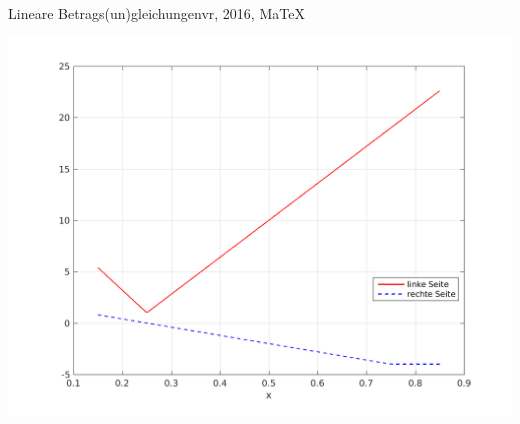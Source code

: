 \begin{MAufgabe}{Lineare Betrags(un)gleichungen}{vr, 2016, MaTeX}
 \begin{center}
 \includegraphics[width=0.8\linewidth]{Abb_zur_Ag_autogenerated_ineq_4.png} \end{center}
 
\else\relax\fi
 \end{MAufgabe}